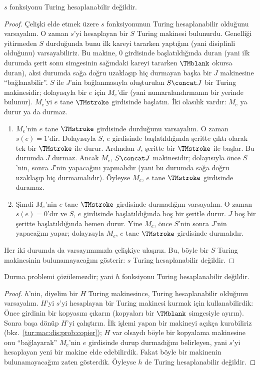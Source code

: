 \begin{lem}
$s$ fonksiyonu Turing hesaplanabilir değildir.
\end{lem}

\begin{proof}
Çelişki elde etmek üzere $s$ fonksiyonunun Turing hesaplanabilir olduğunu
varsayalım. O zaman $s$'yi hesaplayan bir $S$ Turing makinesi bulunurdu.
Genelliği yitirmeden $S$ durduğunda bunu ilk kareyi tararken yaptığını (yani
disiplinli olduğunu) varsayabiliriz. Bu makine, $0$ girdisinde
başlatıldığında duran (yani ilk durumda şerit sonu simgesinin sağındaki kareyi
tararken $\TMblank$ okursa duran), aksi durumda sağa doğru uzaklaşıp hiç
durmayan başka bir $J$ makinesine ``bağlanabilir''. $S$ ile $J$'nin
bağlanmasıyla oluşturulan $S\concat J$ bir Turing makinesidir; dolayısıyla
bir $e$ için $M_e$'dir (yani numaralandırmanın bir yerinde bulunur). $M_e$'yi
$e$ tane $\TMstroke$ girdisinde başlatın. İki olasılık vardır: $M_e$ ya durur
ya da durmaz.
\begin{enumerate}
\item $M_e$'nin $e$ tane $\TMstroke$ girdisinde durduğunu varsayalım. O zaman
  $s(e)=1$'dir. Dolayısıyla $S$, $e$ girdisinde başlatıldığında şeritte çıktı
  olarak tek bir $\TMstroke$ ile durur. Ardından $J$, şeritte bir
  $\TMstroke$ ile başlar. Bu durumda $J$ durmaz. Ancak $M_e$, $S\concat J$
  makinesidir; dolayısıyla önce $S$'nin, sonra $J$'nin yapacağını yapmalıdır
  (yani bu durumda sağa doğru uzaklaşıp hiç durmamalıdır). Öyleyse $M_e$,
  $e$ tane $\TMstroke$ girdisinde duramaz.

\item Şimdi $M_e$'nin $e$ tane $\TMstroke$ girdisinde durmadığını
  varsayalım. O zaman $s(e)=0$'dır ve $S$, $e$ girdisinde başlatıldığında boş
  bir şeritle durur. $J$ boş bir şeritte başlatıldığında hemen durur. Yine
  $M_e$, önce $S$'nin sonra $J$'nin yapacağını yapar; dolayısıyla $M_e$, $e$
  tane $\TMstroke$ girdisinde durmalıdır.
\end{enumerate}
Her iki durumda da varsayımımızla çelişkiye ulaşırız. Bu, böyle bir $S$
Turing makinesinin bulunamayacağını gösterir: $s$ Turing hesaplanabilir
değildir.
\end{proof}

\begin{thm}
 Durma problemi çözülemezdir; yani $h$ fonksiyonu
Turing hesaplanabilir değildir.
\end{thm}

\begin{proof}
$h$'nin, diyelim bir $H$ Turing makinesince, Turing hesaplanabilir olduğunu
varsayalım. $H$'yi $s$'yi hesaplayan bir Turing makinesi kurmak için
kullanabilirdik: Önce girdinin bir kopyasını çıkarın (kopyaları bir
$\TMblank$ simgesiyle ayırın). Sonra başa dönüp $H$'yi çalıştırın. İlk işlemi
yapan bir makineyi açıkça kurabiliriz (bkz.~\cref{tur:mac:dis:prob:copier});
$H$ var olsaydı böyle bir kopyalama makinesine onu ``bağlayarak'' $M_e$'nin
$e$ girdisinde durup durmadığını belirleyen, yani $s$'yi hesaplayan yeni bir
makine elde edebilirdik. Fakat böyle bir makinenin bulunamayacağını zaten
gösterdik. Öyleyse $h$ de Turing hesaplanabilir değildir.
\end{proof}

